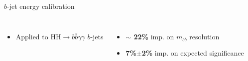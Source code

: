 \begin{frame}{$b$-jet energy calibration}
\begin{columns}
\begin{itemize}
    \item Applied to HH$\to b\bar{b}\gamma\gamma$ $b$-jets
\end{itemize}
\pause
{}
\begin{itemize}
    \item \textcolor{HHred}{\textbf{$\sim$ 22\%}} imp. on $m_{b \bar{b}}$ resolution
    \item \textcolor{HHred}{\textbf{7\%$\pm$2\%}} imp. on expected significance
\end{itemize}

\end{columns}    
\end{frame}



